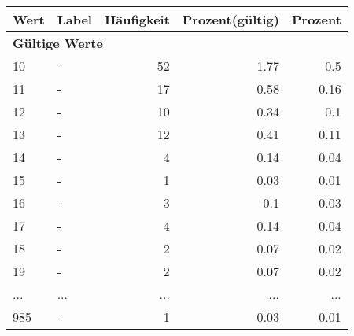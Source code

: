     \begin{longtable}{lXrrr}
     \toprule
     \textbf{Wert} & \textbf{Label} & \textbf{Häufigkeit} & \textbf{Prozent(gültig)} & \textbf{Prozent} \\
     \endhead
     \midrule
     \multicolumn{5}{l}{\textbf{Gültige Werte}}\\
        10 & \multicolumn{1}{X}{-} & %
          \num{52} &
          \num[round-mode=places,round-precision=2]{1.77} &
          \num[round-mode=places,round-precision=2]{0.5} \\
        11 & \multicolumn{1}{X}{-} & %
          \num{17} &
          \num[round-mode=places,round-precision=2]{0.58} &
          \num[round-mode=places,round-precision=2]{0.16} \\
        12 & \multicolumn{1}{X}{-} & %
          \num{10} &
          \num[round-mode=places,round-precision=2]{0.34} &
          \num[round-mode=places,round-precision=2]{0.1} \\
        13 & \multicolumn{1}{X}{-} & %
          \num{12} &
          \num[round-mode=places,round-precision=2]{0.41} &
          \num[round-mode=places,round-precision=2]{0.11} \\
        14 & \multicolumn{1}{X}{-} & %
          \num{4} &
          \num[round-mode=places,round-precision=2]{0.14} &
          \num[round-mode=places,round-precision=2]{0.04} \\
        15 & \multicolumn{1}{X}{-} & %
          \num{1} &
          \num[round-mode=places,round-precision=2]{0.03} &
          \num[round-mode=places,round-precision=2]{0.01} \\
        16 & \multicolumn{1}{X}{-} & %
          \num{3} &
          \num[round-mode=places,round-precision=2]{0.1} &
          \num[round-mode=places,round-precision=2]{0.03} \\
        17 & \multicolumn{1}{X}{-} & %
          \num{4} &
          \num[round-mode=places,round-precision=2]{0.14} &
          \num[round-mode=places,round-precision=2]{0.04} \\
        18 & \multicolumn{1}{X}{-} & %
          \num{2} &
          \num[round-mode=places,round-precision=2]{0.07} &
          \num[round-mode=places,round-precision=2]{0.02} \\
        19 & \multicolumn{1}{X}{-} & %
          \num{2} &
          \num[round-mode=places,round-precision=2]{0.07} &
          \num[round-mode=places,round-precision=2]{0.02} \\
       ... & ... & ... & ... & ... \\
        985 & \multicolumn{1}{X}{-} & %
          \num{1} &
          \num[round-mode=places,round-precision=2]{0.03} &
          \num[round-mode=places,round-precision=2]{0.01} \\


\end{longtable}
